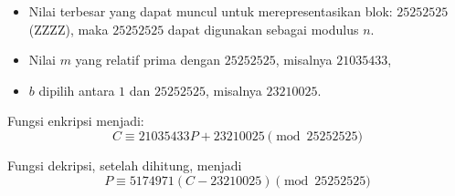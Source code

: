 \documentclass{article}
\begin{document}

\begin{itemize}
    \item Nilai terbesar yang dapat muncul untuk merepresentasikan blok: $25252525$ (ZZZZ), maka $25252525$ dapat digunakan sebagai modulus $n$.
    \item Nilai $m$ yang relatif prima dengan $25252525$, misalnya $21035433$,
    \item $b$ dipilih antara $1$ dan $25252525$, misalnya $23210025$.
\end{itemize}

\noindent Fungsi enkripsi menjadi:
\[ C \equiv 21035433P + 23210025 \pmod{25252525} \]

\noindent Fungsi dekripsi, setelah dihitung, menjadi
\[ P \equiv 5174971 (C - 23210025) \pmod{25252525} \]
\end{document}

